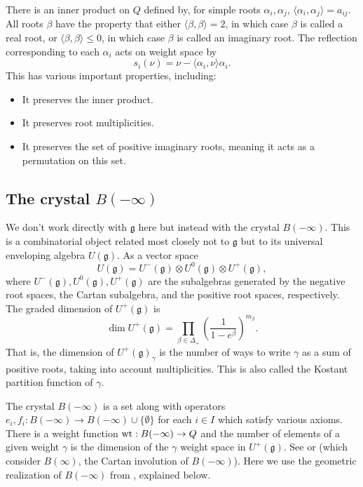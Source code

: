 \documentclass{amsart}
\numberwithin{equation}{section}
\numberwithin{figure}{section}
\numberwithin{table}{section}
\theoremstyle{definition}
\newcommand{\wt}{{\rm wt}}
\newcommand{\g}{\mathfrak{g}}
\begin{document}
There is an inner product on $Q$ defined by, for simple roots $\alpha_i,\alpha_j$, $\langle \alpha_i, \alpha_j \rangle = a_{ij}$. All roots $\beta$ have the property that either $\langle \beta, \beta \rangle=2$, in which case $\beta$ is called a real root, or $\langle \beta, \beta \rangle \leq 0$, in which case $\beta$ is called an imaginary root.
The reflection corresponding to each $\alpha_i$ acts on weight space by $$s_i(\nu)= \nu- \langle \alpha_i , \nu \rangle \alpha_i.$$
This has various important properties, including:
\begin{itemize}
\item It preserves the inner product.

\item It preserves root multiplicities.

\item It preserves the set of positive imaginary roots, meaning it acts as a permutation on this set. 
\end{itemize} 


\subsection{The crystal $B(-\infty)$}
We don't work directly with $\g$ here but instead with the crystal $B(-\infty)$. This is a combinatorial object related most closely not to $\g$ but to its universal enveloping algebra $U(\mathfrak{g})$. As a vector space 
$$U(\g)= U^-(\g) \otimes U^0(\g) \otimes U^+(\g),$$
where $U^-(\g), U^0(\g), U^+(\g)$ are the subalgebras generated by the negative root spaces, the Cartan subalgebra, and the positive root spaces, respectively. The graded dimension of $U^+(\g)$ is 
$$\dim U^+(\g) = \prod_{\beta \in \Delta_+} \left( \frac{1}{1-e^\beta} \right)^{m_\beta}.$$
That is, the dimension of $U^+(\g)_\gamma$ is the number of ways to write $\gamma$ as a sum of positive roots, taking into account multiplicities. This is also called the Kostant partition function of $\gamma$. 

The crystal $B(-\infty)$ is a set along with operators $e_{i}, f_{i} \colon B(-\infty) \rightarrow B(-\infty) \cup \{ \emptyset \}$ for each $i \in I$ which satisfy various axioms. There is a weight function $\wt: B(-\infty) \rightarrow Q$ and the number of elements of a given weight $\gamma$ is the dimension of the $\gamma$ weight space in $U^+(\mathfrak{g})$.
See \cite{Kashiwara:1995} or \cite{HK:2002} (which consider $B(\infty)$, the Cartan involution of $B(-\infty)$).  Here we use the geometric realization of $B(-\infty)$ from \cite{KS:1997}, explained below. 
\end{document}
